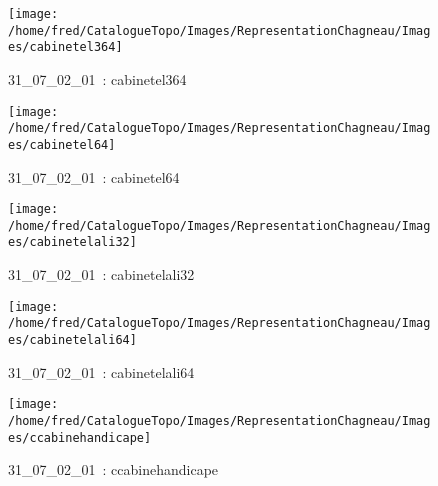 \documentclass[12pt,titlepage]{book}
\begin{document}
\begin{figure}[h!]
\begin{minipage}[t]{3cm}
\begin{center}
    \end{center}
  \end{minipage}
  \begin{minipage}[t]{3cm}
    \begin{center}
      \texttt{[image: /home/fred/CatalogueTopo/Images/RepresentationChagneau/Images/cabinetel364]}
      \caption[~31\_07\_02\_01]{\small{31\_07\_02\_01~:} \tiny{cabinetel364}}\label{cabinetel364}
    \end{center}
  \end{minipage}
  \begin{minipage}[t]{3cm}
    \begin{center}
      \texttt{[image: /home/fred/CatalogueTopo/Images/RepresentationChagneau/Images/cabinetel64]}
      \caption[~31\_07\_02\_01]{\small{31\_07\_02\_01~:} \tiny{cabinetel64}}\label{cabinetel64}
    \end{center}
  \end{minipage}
  \begin{minipage}[t]{3cm}
    \begin{center}
      \texttt{[image: /home/fred/CatalogueTopo/Images/RepresentationChagneau/Images/cabinetelali32]}
      \caption[~31\_07\_02\_01]{\small{31\_07\_02\_01~:} \tiny{cabinetelali32}}\label{cabinetelali32}
    \end{center}
  \end{minipage}
  \begin{minipage}[t]{3cm}
    \begin{center}
      \texttt{[image: /home/fred/CatalogueTopo/Images/RepresentationChagneau/Images/cabinetelali64]}
      \caption[~31\_07\_02\_01]{\small{31\_07\_02\_01~:} \tiny{cabinetelali64}}\label{cabinetelali64}
    \end{center}
  \end{minipage}
  \begin{minipage}[t]{3cm}
    \begin{center}
      \texttt{[image: /home/fred/CatalogueTopo/Images/RepresentationChagneau/Images/ccabinehandicape]}
      \caption[~31\_07\_02\_01]{\small{31\_07\_02\_01~:} \tiny{ccabinehandicape}}\label{ccabinehandicape}
    \end{center}
  \end{minipage}

\end{figure}
\end{document}
